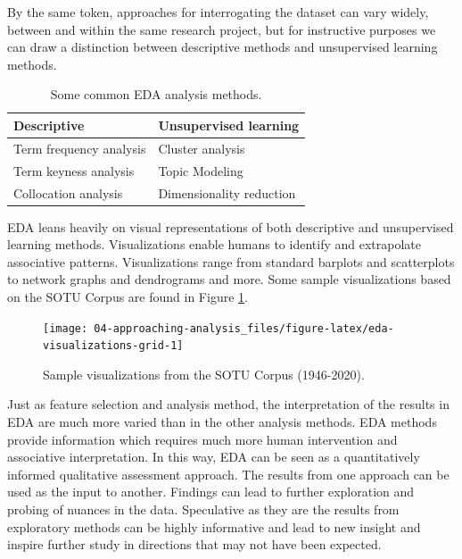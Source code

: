 \documentclass[
]{article}
\begin{document}
By the same token, approaches for interrogating the dataset can vary widely, between and within the same research project, but for instructive purposes we can draw a distinction between descriptive methods and unsupervised learning methods.

\begin{table}

\caption{\label{tab:eda-approaches-table}Some common EDA analysis methods.}
\centering
\begin{tabular}[t]{ll}
\toprule
Descriptive & Unsupervised learning\\
\midrule
Term frequency analysis & Cluster analysis\\
Term keyness analysis & Topic Modeling\\
Collocation analysis & Dimensionality reduction\\
\bottomrule
\end{tabular}
\end{table}

EDA leans heavily on visual representations of both descriptive and unsupervised learning methods. Visualizations enable humans to identify and extrapolate associative patterns. Visualizations range from standard barplots and scatterplots to network graphs and dendrograms and more. Some sample visualizations based on the SOTU Corpus are found in Figure \ref{fig:eda-visualizations-grid}.

\begin{figure}

{\centering \texttt{[image: 04-approaching-analysis\_files/figure-latex/eda-visualizations-grid-1]} 

}

\caption{Sample visualizations from the SOTU Corpus (1946-2020).}\label{fig:eda-visualizations-grid}
\end{figure}

Just as feature selection and analysis method, the interpretation of the results in EDA are much more varied than in the other analysis methods. EDA methods provide information which requires much more human intervention and associative interpretation. In this way, EDA can be seen as a quantitatively informed qualitative assessment approach. The results from one approach can be used as the input to another. Findings can lead to further exploration and probing of nuances in the data. Speculative as they are the results from exploratory methods can be highly informative and lead to new insight and inspire further study in directions that may not have been expected.
\end{document}
